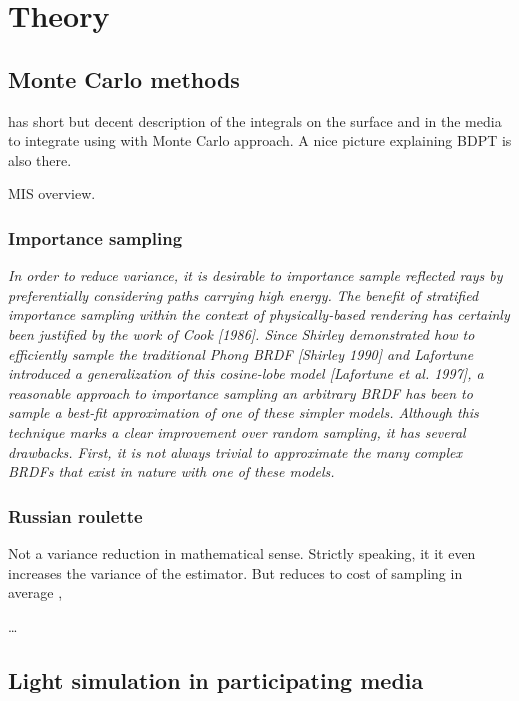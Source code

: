 \chapter{Theory}
\label{chapter:theory}

\section{Monte Carlo methods}
\label{Monte-Carlo}
\cite{Lafortune:1996:RPM:275458.275468} has short but decent description of the integrals on the
surface and in the media to integrate using with Monte Carlo approach.
A nice picture explaining BDPT is also there.

\gls{MIS} overview.
\subsection{Importance sampling}
\label{ImportanceSampling}
\emph{In order to reduce variance,  it is desirable to importance sample reflected rays by
preferentially considering paths carrying high energy.} \emph{The benefit of stratified importance
sampling  within  the  context  of  physically-based rendering  has  certainly  been  justified by 
the  work  of Cook  [1986].   Since  Shirley demonstrated  how  to  efficiently  sample  the 
traditional  Phong BRDF  [Shirley  1990]  and Lafortune  introduced  a  generalization of  this 
cosine-lobe  model  [Lafortune  et  al.  1997], a  reasonable approach to importance sampling an
arbitrary BRDF has been to sample  a  best-fit approximation  of  one  of  these  simpler  models.
Although this technique marks a clear improvement over random sampling,  it has several drawbacks.
First, it is not always trivial to approximate the many complex BRDFs that exist in nature with one
of these models.}

\subsection{Russian roulette}
\label{subsection:rr}
Not a variance reduction in mathematical sense. Strictly speaking, it it even
increases the variance of the estimator. But reduces to cost of sampling in
average \cite{Veach:1998:RMC:927297}, \cite{Csi03variancereduction}

\ldots

\section{Light simulation in participating media}
